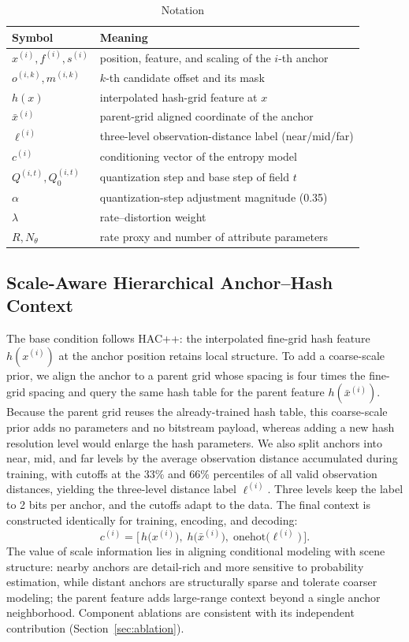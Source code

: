 \documentclass[conference]{IEEEtran}
\begin{document}
\begin{table}[t]
\caption{Notation}
\centering
\begin{tabular}{@{}ll@{}}
\toprule
\textbf{Symbol} & \textbf{Meaning} \\
\midrule
\(x^{(i)},f^{(i)},s^{(i)}\) & position, feature, and scaling of the $i$-th anchor \\
\(o^{(i,k)},m^{(i,k)}\) & $k$-th candidate offset and its mask \\
\(h(x)\) & interpolated hash-grid feature at $x$ \\
\(\bar{x}^{(i)}\) & parent-grid aligned coordinate of the anchor \\
\(\ell^{(i)}\) & three-level observation-distance label (near/mid/far) \\
\(c^{(i)}\) & conditioning vector of the entropy model \\
\(Q^{(i,t)},Q_{0}^{(i,t)}\) & quantization step and base step of field $t$ \\
\(\alpha\) & quantization-step adjustment magnitude (0.35) \\
\(\lambda\) & rate--distortion weight \\
\(R,N_{\theta}\) & rate proxy and number of attribute parameters \\
\bottomrule
\end{tabular}
\label{tab:notation}
\end{table}

\subsection{Scale-Aware Hierarchical Anchor--Hash Context}
The base condition follows HAC++: the interpolated fine-grid hash
feature $h(x^{(i)})$ at the anchor position retains local structure. To
add a coarse-scale prior, we align the anchor to a parent grid whose
spacing is four times the fine-grid spacing and query the same hash
table for the parent feature $h(\bar{x}^{(i)})$. Because the parent grid
reuses the already-trained hash table, this coarse-scale prior adds no
parameters and no bitstream payload, whereas adding a new hash
resolution level would enlarge the hash parameters. We also split
anchors into near, mid, and far levels by the average observation
distance accumulated during training, with cutoffs at the 33\% and 66\%
percentiles of all valid observation distances, yielding the three-level
distance label $\ell^{(i)}$. Three levels keep the label to 2 bits per
anchor, and the cutoffs adapt to the data. The final context is
constructed identically for training, encoding, and decoding:
\begin{equation}
c^{(i)} = \bigl[\, h\bigl(x^{(i)}\bigr),\; h\bigl(\bar{x}^{(i)}\bigr),\;
\text{onehot}\bigl(\ell^{(i)}\bigr) \,\bigr].
\label{eq:context}
\end{equation}
The value of scale information lies in aligning conditional modeling
with scene structure: nearby anchors are detail-rich and more sensitive
to probability estimation, while distant anchors are structurally sparse
and tolerate coarser modeling; the parent feature adds large-range
context beyond a single anchor neighborhood. Component ablations are
consistent with its independent contribution (Section~\ref{sec:ablation}).
\end{document}
